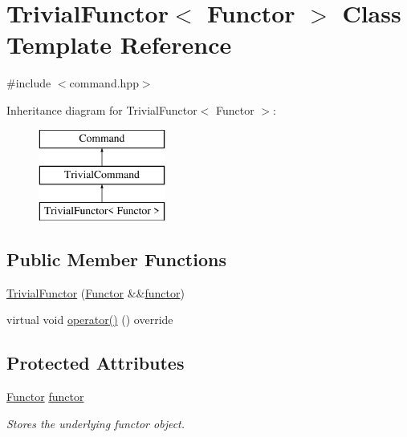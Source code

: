 \hypertarget{class_trivial_functor}{}\section{Trivial\+Functor$<$ Functor $>$ Class Template Reference}
\label{class_trivial_functor}


{\ttfamily \#include $<$command.\+hpp$>$}

Inheritance diagram for Trivial\+Functor$<$ Functor $>$\+:\begin{figure}[H]
\begin{center}
\leavevmode
\includegraphics[height=3.000000cm]{class_trivial_functor}
\end{center}
\end{figure}
\subsection*{Public Member Functions}
\begin{DoxyCompactItemize}
\item 
\mbox{\hyperlink{class_trivial_functor_ab5798bb2ea9fcdb5bf910662ac49c34c}{Trivial\+Functor}} (\mbox{\hyperlink{class_functor}{Functor}} \&\&\mbox{\hyperlink{class_trivial_functor_a293617a9f9c35365e37237183c7e6fac}{functor}})
\item 
virtual void \mbox{\hyperlink{class_trivial_functor_a5f9b8d18c11a057c2b3e97703262d1e9}{operator()}} () override
\end{DoxyCompactItemize}
\subsection*{Protected Attributes}
\begin{DoxyCompactItemize}
\item 
\mbox{\label{class_trivial_functor_a293617a9f9c35365e37237183c7e6fac}} 
\mbox{\hyperlink{class_functor}{Functor}} \mbox{\hyperlink{class_trivial_functor_a293617a9f9c35365e37237183c7e6fac}{functor}}
\begin{DoxyCompactList}\small\item\em Stores the underlying functor object. \end{DoxyCompactList}\end{DoxyCompactItemize}


